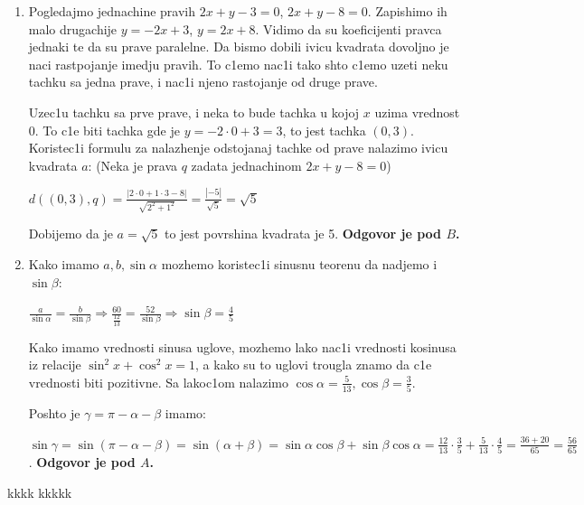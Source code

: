 \documentclass[a4paper,12pt]{article}
\begin{document}
\begin{enumerate}[1.]
\item Pogledajmo jednachine pravih $2x + y - 3 = 0$, $2x +y -8 = 0$. Zapishimo ih malo drugachije $y = -2x +3$, $y=  2x + 8$. Vidimo da su koeficijenti pravca jednaki te da su prave paralelne. Da bismo dobili ivicu kvadrata dovoljno je naci rastpojanje imedju pravih. To c1emo nac1i tako shto c1emo uzeti neku tachku sa jedna prave, i nac1i njeno rastojanje od druge prave.
\par Uzec1u tachku sa prve prave, i neka to bude tachka u kojoj $x$ uzima vrednost 0. To c1e biti tachka gde je $y = -2 \cdot 0 +3 = 3$, to jest tachka $(0,3)$. Koristec1i formulu za nalazhenje odstojanaj tachke od prave nalazimo ivicu kvadrata $a$: (Neka je prava $q$ zadata jednachinom $ 2x+y-8 = 0$)
\par $d((0,3), q) = \frac{|2 \cdot 0 + 1 \cdot 3 -8|}{\sqrt{2^2 + 1^2}} = \frac{|-5|}{\sqrt{5}} = \sqrt{5}$
\par Dobijemo da je $a = \sqrt{5}$ to jest povrshina kvadrata je 5. \textbf{Odgovor je pod $B$.} 


\item Kako imamo $a,b,\sin{\alpha} $ mozhemo koristec1i sinusnu teorenu da nadjemo i $\sin{\beta}$:
\par $ \frac{a}{\sin{\alpha}}= \frac{b}{\sin{\beta}}  \Longrightarrow \frac{60}{\frac{12}{13}}= \frac{52}{\sin{\beta}} \Longrightarrow \sin{\beta} = \frac{4}{5} $
\par Kako imamo vrednosti sinusa uglove, mozhemo lako nac1i vrednosti kosinusa iz relacije $\sin^2  x  +\cos^2  x  = 1$, a kako su to uglovi trougla znamo da c1e vrednosti biti pozitivne. Sa lakoc1om nalazimo $\cos{\alpha} = \frac{5}{13}, \cos{\beta} = \frac{3}{5} $.
\par Poshto je $\gamma = \pi - \alpha - \beta$ imamo: 
\par $\sin{\gamma} = \sin(\pi - \alpha - \beta)= \sin( \alpha + \beta) = \sin{\alpha}\cos{\beta} + \sin{\beta} \cos{\alpha} = \frac{12}{13}\cdot \frac{3}{5} + \frac{5}{13}  \cdot \frac{4}{5} = \frac{36+20}{65} = \frac{56}{65} $. \textbf{Odgovor je pod $A$.}


\end{enumerate}
\newpage


\begin{thebibliography}{9}
 kkkk
 kkkkk

\end{thebibliography}
\end{document}
